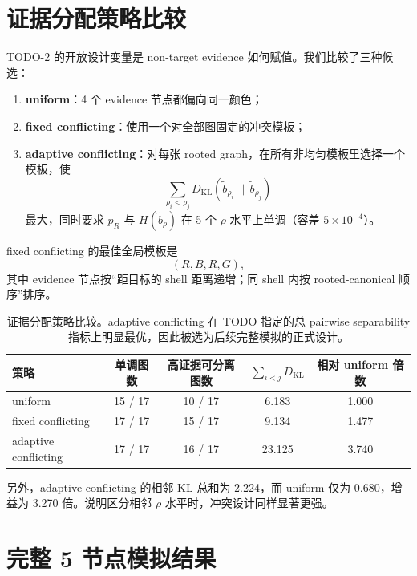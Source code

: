 \documentclass[11pt,a4paper]{ctexart}
\begin{document}
\section{证据分配策略比较}

TODO-2 的开放设计变量是 non-target evidence 如何赋值。我们比较了三种候选：
\begin{enumerate}
    \item \textbf{uniform}：4 个 evidence 节点都偏向同一颜色；
    \item \textbf{fixed conflicting}：使用一个对全部图固定的冲突模板；
    \item \textbf{adaptive conflicting}：对每张 rooted graph，在所有非均匀模板里选择一个模板，使
    \[
    \sum_{\rho_i<\rho_j} D_{\mathrm{KL}}(\tilde b_{\rho_i}\,\|\,\tilde b_{\rho_j})
    \]
    最大，同时要求 $p_R$ 与 $H(\tilde b_\rho)$ 在 5 个 $\rho$ 水平上单调（容差 $5\times 10^{-4}$）。
\end{enumerate}

fixed conflicting 的最佳全局模板是
\[
(R,B,R,G),
\]
其中 evidence 节点按“距目标的 shell 距离递增；同 shell 内按 rooted-canonical 顺序”排序。

\begin{table}[ht]
\centering
\small
\begin{tabular}{lcccc}
\toprule
策略 & 单调图数 & 高证据可分离图数 & $\sum_{i<j} D_{\mathrm{KL}}$ & 相对 uniform 倍数 \\
\midrule
uniform & 15 / 17 & 10 / 17 & 6.183 & 1.000 \\
fixed conflicting & 17 / 17 & 15 / 17 & 9.134 & 1.477 \\
adaptive conflicting & 17 / 17 & 16 / 17 & 23.125 & 3.740 \\
\bottomrule
\end{tabular}
\caption{证据分配策略比较。adaptive conflicting 在 TODO 指定的总 pairwise separability 指标上明显最优，因此被选为后续完整模拟的正式设计。}
\end{table}

另外，adaptive conflicting 的相邻 KL 总和为 2.224，而 uniform 仅为 0.680，增益为 3.270 倍。说明区分相邻 $\rho$ 水平时，冲突设计同样显著更强。

\section{完整 5 节点模拟结果}
\end{document}
